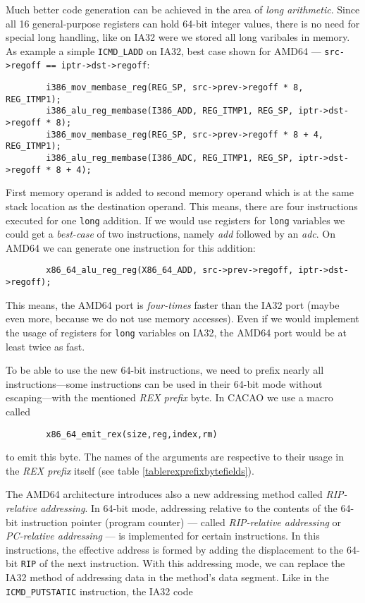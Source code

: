 Much better code generation can be achieved in the area of
\textit{long arithmetic}. Since all 16 general-purpose registers can
hold 64-bit integer values, there is no need for special long
handling, like on IA32 were we stored all long varibales in memory. As
example a simple \texttt{ICMD\_LADD} on IA32, best case shown for
AMD64 --- \texttt{src->regoff == iptr->dst->regoff}:

\begin{verbatim}
        i386_mov_membase_reg(REG_SP, src->prev->regoff * 8, REG_ITMP1);
        i386_alu_reg_membase(I386_ADD, REG_ITMP1, REG_SP, iptr->dst->regoff * 8);
        i386_mov_membase_reg(REG_SP, src->prev->regoff * 8 + 4, REG_ITMP1);
        i386_alu_reg_membase(I386_ADC, REG_ITMP1, REG_SP, iptr->dst->regoff * 8 + 4);
\end{verbatim}

First memory operand is added to second memory operand which is at the
same stack location as the destination operand. This means, there are
four instructions executed for one \texttt{long} addition. If we would
use registers for \texttt{long} variables we could get a
\textit{best-case} of two instructions, namely \textit{add} followed
by an \textit{adc}. On AMD64 we can generate one instruction for this
addition:

\begin{verbatim}
        x86_64_alu_reg_reg(X86_64_ADD, src->prev->regoff, iptr->dst->regoff);
\end{verbatim}

This means, the AMD64 port is \textit{four-times} faster than the IA32
port (maybe even more, because we do not use memory accesses). Even if
we would implement the usage of registers for \texttt{long} variables
on IA32, the AMD64 port would be at least twice as fast.

To be able to use the new 64-bit instructions, we need to prefix
nearly all instructions---some instructions can be used in their
64-bit mode without escaping---with the mentioned \textit{REX prefix}
byte. In CACAO we use a macro called

\begin{verbatim}
        x86_64_emit_rex(size,reg,index,rm)
\end{verbatim}

to emit this byte. The names of the arguments are respective to their
usage in the \textit{REX prefix} itself (see table
\ref{tablerexprefixbytefields}).

The AMD64 architecture introduces also a new addressing method called
\textit{RIP-relative addressing}. In 64-bit mode, addressing relative
to the contents of the 64-bit instruction pointer (program counter)
--- called \textit{RIP-relative addressing} or \textit{PC-relative
addressing} --- is implemented for certain instructions. In this
instructions, the effective address is formed by adding the
displacement to the 64-bit \texttt{RIP} of the next instruction. With
this addressing mode, we can replace the IA32 method of addressing
data in the method's data segment. Like in the
\texttt{ICMD\_PUTSTATIC} instruction, the IA32 code

